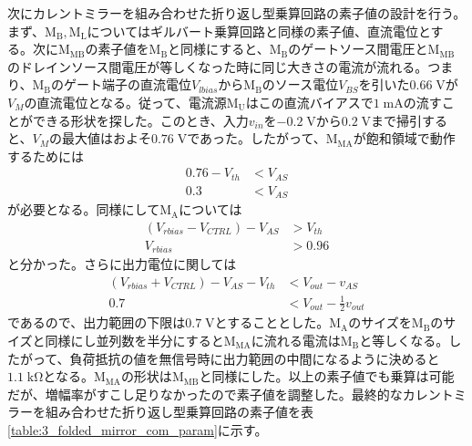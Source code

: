         次にカレントミラーを組み合わせた折り返し型乗算回路の素子値の設計を行う。まず、$\mathrm{M_{B},M_{L}}$についてはギルバート乗算回路と同様の素子値、直流電位とする。次に$\mathrm{M_{MB}}$の素子値を$\mathrm{M_{B}}$と同様にすると、$\mathrm{M_{B}}$のゲートソース間電圧と$\mathrm{M_{MB}}$のドレインソース間電圧が等しくなった時に同じ大きさの電流が流れる。つまり、$\mathrm{M_{B}}$のゲート端子の直流電位$V_{lbias}$から$\mathrm{M_{B}}$のソース電位$V_{BS}$を引いた$0.66\;\mathrm{V}$が$V_{M}$の直流電位となる。従って、電流源$\mathrm{M_{U}}$はこの直流バイアスで$1\;\mathrm{mA}$の流すことができる形状を探した。このとき、入力$v_{in}$を$-0.2\;\mathrm{V}$から$0.2\;\mathrm{V}$まで掃引すると、$V_{M}$の最大値はおよそ$0.76\;\mathrm{V}$であった。したがって、$\mathrm{M_{MA}}$が飽和領域で動作するためには
        \begin{align*}
            0.76-V_{th} &< V_{AS}      \\
            0.3 &< V_{AS}
        \end{align*}
        が必要となる。同様にして$\mathrm{M_{A}}$については
        \begin{align*}
            \left( V_{rbias}-V_{CTRL} \right) -V_{AS} &> V_{th}     \\
            V_{rbias} &> 0.96
        \end{align*}
        と分かった。さらに出力電位に関しては
        \begin{align*}
            \left( V_{rbias}+V_{CTRL} \right) - V_{AS} - V_{th} &< V_{out} - v_{AS} \\
            0.7 &< V_{out} - \frac{1}{2}v_{out}
        \end{align*}
        であるので、出力範囲の下限は$0.7\;\mathrm{V}$とすることとした。$\mathrm{M_{A}}$のサイズを$\mathrm{M_{B}}$のサイズと同様にし並列数を半分にすると$\mathrm{M_{MA}}$に流れる電流は$\mathrm{M_{B}}$と等しくなる。したがって、負荷抵抗の値を無信号時に出力範囲の中間になるように決めると$1.1\;\mathrm{k\Omega}$となる。$\mathrm{M_{MA}}$の形状は$\mathrm{M_{MB}}$と同様にした。以上の素子値でも乗算は可能だが、増幅率がすこし足りなかったので素子値を調整した。最終的なカレントミラーを組み合わせた折り返し型乗算回路の素子値を表\ref{table:3_folded_mirror_com_param}に示す。
